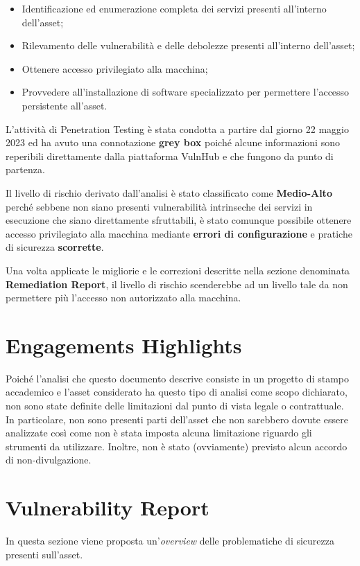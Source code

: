 \documentclass[a4paper, 12pt, oneside]{article}
\begin{document}
\begin{itemize}
    \item Identificazione ed enumerazione completa dei servizi presenti all'interno dell'asset;
    \item Rilevamento delle vulnerabilità e delle debolezze presenti all'interno dell'asset;
    \item Ottenere accesso privilegiato alla macchina;
    \item Provvedere all'installazione di software specializzato per permettere l'accesso persistente all'asset.
\end{itemize}

L'attività di Penetration Testing è stata condotta a partire dal giorno 22 maggio 2023 ed ha avuto una connotazione \textbf{grey box} poiché alcune informazioni sono reperibili direttamente dalla piattaforma VulnHub e che fungono da punto di partenza.

Il livello di rischio derivato dall'analisi è stato classificato come \textbf{Medio-Alto} perché sebbene non siano presenti vulnerabilità intrinseche dei servizi in esecuzione che siano direttamente sfruttabili, è stato comunque possibile ottenere accesso privilegiato alla macchina mediante \textbf{errori di configurazione} e pratiche di sicurezza \textbf{scorrette}.

Una volta applicate le migliorie e le correzioni descritte nella sezione denominata \textbf{Remediation Report}, il livello di rischio scenderebbe ad un livello tale da non permettere più l'accesso non autorizzato alla macchina.

\newpage

\section{Engagements Highlights}
Poiché l'analisi che questo documento descrive consiste in un progetto di stampo accademico e l'asset considerato ha questo tipo di analisi come scopo dichiarato, non sono state definite delle limitazioni dal punto di vista legale o contrattuale. In particolare, non sono presenti parti dell'asset che non sarebbero dovute essere analizzate così come non è stata imposta alcuna limitazione riguardo gli strumenti da utilizzare. Inoltre, non è stato (ovviamente) previsto alcun accordo di non-divulgazione.

\newpage

\section{Vulnerability Report}
In questa sezione viene proposta un'\textit{overview} delle problematiche di sicurezza presenti sull'asset.
\end{document}
